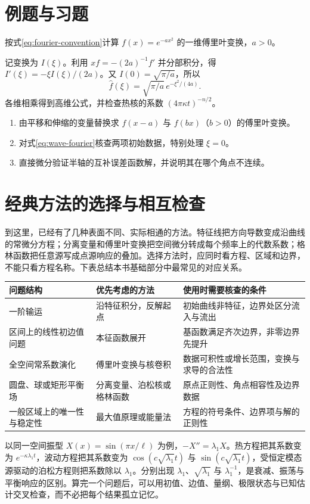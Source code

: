 \section{例题与习题}
\begin{example}
按式\eqref{eq:fourier-convention}计算 $f(x)=e^{-a x^2}$ 的一维傅里叶变换，$a>0$。
\end{example}
\begin{solve}
记变换为 $I(\xi)$。利用 $xf=-(2a)^{-1}f'$ 并分部积分，得 $I'(\xi)=-\xi I(\xi)/(2a)$。又 $I(0)=\sqrt{\pi/a}$，所以
\[
 \widehat f(\xi)=\sqrt{\pi/a}\,e^{-\xi^2/(4a)}.
\]
各维相乘得到高维公式，并检查热核的系数 $(4\pi\kappa t)^{-n/2}$。
\end{solve}
\begin{enumerate}
 \item 由平移和伸缩的变量替换求 $f(x-a)$ 与 $f(bx)$（$b>0$）的傅里叶变换。
 \item 对式\eqref{eq:wave-fourier}核查两项初始数据，特别处理 $\xi=0$。
 \item 直接微分验证半轴的互补误差函数解，并说明其在哪个角点不连续。
\end{enumerate}

\section{经典方法的选择与相互检查}
\label{sec:method-comparison}
到这里，已经有了几种表面不同、实际相通的方法。特征线把方向导数变成沿曲线的常微分方程；分离变量和傅里叶变换把空间微分转成每个频率上的代数系数；格林函数把任意源写成点源响应的叠加。选择方法时，应同时看方程、区域和边界，不能只看方程名称。下表总结本书基础部分中最常见的对应关系。
\begin{center}
\begin{tabularx}{\textwidth}{@{}lYY@{}}
\toprule
问题结构 & 优先考虑的方法 & 使用时需要核查的条件\\
\midrule
一阶输运 & 沿特征积分，反解起点 & 初始曲线非特征，边界处区分流入与流出\\
区间上的线性初边值问题 & 本征函数展开 & 基函数满足齐次边界，非零边界先提升\\
全空间常系数演化 & 傅里叶变换与核卷积 & 数据可积性或增长范围，变换与求导的合法性\\
圆盘、球或矩形平衡场 & 分离变量、泊松核或格林函数 & 原点正则性、角点相容性及边界数据\\
一般区域上的唯一性与稳定性 & 最大值原理或能量法 & 方程的符号条件、边界项与解的正则性\\
\bottomrule
\end{tabularx}
\end{center}

以同一空间振型 $X(x)=\sin(\pi x/\ell)$ 为例，$-X''=\lambda_1X$。热方程把其系数变为 $e^{-\kappa\lambda_1t}$，波动方程把其系数变为 $\cos(c\sqrt{\lambda_1}t)$ 与 $\sin(c\sqrt{\lambda_1}t)$，受恒定模态源驱动的泊松方程则把系数除以 $\lambda_1$。分别出现 $\lambda_1$、$\sqrt{\lambda_1}$ 与 $\lambda_1^{-1}$，是衰减、振荡与平衡响应的区别。算完一个问题后，可以用初值、边值、量纲、极限状态与已知估计交叉检查，而不必把每个结果孤立记忆。

